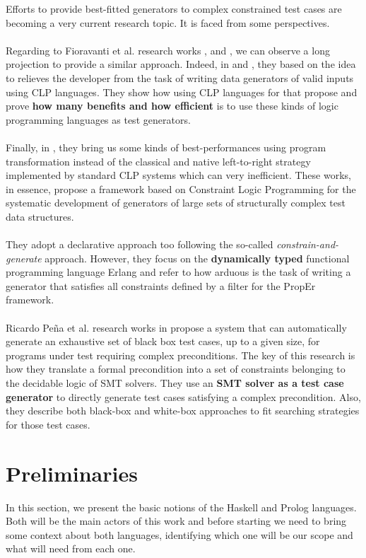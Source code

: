 \documentclass{report}
\theoremstyle{definition}
\theoremstyle{definition}
\begin{document}
Efforts to provide best-fitted generators to complex constrained test cases are becoming a very current research topic. It is faced from some perspectives.\\\\
Regarding to Fioravanti et al. research works \cite{pbtfree}, \cite{genclp} and \cite{effgenttransf}, we can observe a long projection to provide a similar approach. Indeed, in \cite{pbtfree} and \cite{genclp}, they based on the idea to relieves the developer from the task of writing data generators of valid inputs using CLP languages. They show how using CLP languages for that propose and prove \textbf{how many benefits and how efficient} is to use these kinds of logic programming languages as test generators.\\\\
Finally, in \cite{effgenttransf}, they bring us some kinds of best-performances using program transformation instead of the classical and native left-to-right strategy implemented by standard CLP systems which can very inefficient. These works, in essence, propose a framework based on Constraint Logic Programming for the systematic development of generators of large sets of structurally complex test data structures.\\\\
They adopt a declarative approach too following the so-called \textit{constrain-and-generate} approach. However, they focus on the \textbf{dynamically typed} functional programming language Erlang and refer to how arduous is the task of writing a generator that satisfies all constraints defined by a filter for the PropEr framework.\\\\
Ricardo Peña et al. research works in \cite{smtbased} propose a system that can automatically generate an exhaustive set of black box test cases, up to a given size, for programs under test requiring complex preconditions. The key of this research is how they translate a formal precondition into a set of constraints belonging to the decidable logic of SMT solvers. They use an \textbf{SMT solver as a test case generator} to directly generate test cases satisfying a complex precondition. Also, they describe both black-box and white-box approaches to fit searching strategies for those test cases.
\pagebreak
\chapter{Preliminaries}
In this section, we present the basic notions of the Haskell and Prolog languages. Both will be the main actors of this work and before starting we need to bring some context about both languages, identifying which one will be our scope and what will need from each one.
\end{document}
